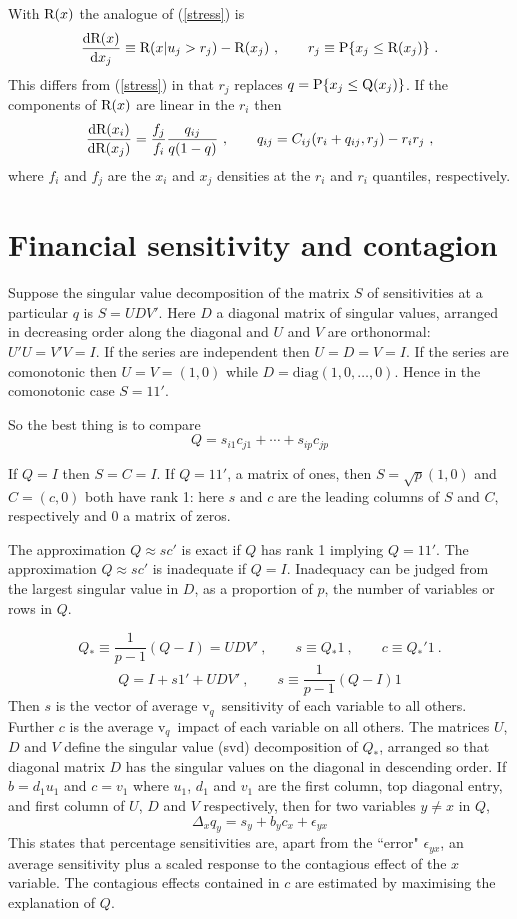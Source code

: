 \documentclass[authoryear]{elsarticle}
\newcommand{\p}{\mathrm{P}}
\newcommand{\diag}{\mathrm{diag}}
\newcommand{\eps}{\epsilon}
\newcommand{\be}{\begin{equation}}
\newcommand{\ee}{\end{equation}}
\newcommand{\de}{\mathrm{d}}
\renewcommand{\v}{\ensuremath{\mathrm{v}_q}}
\newcommand{\eref}[1]{(\ref{#1})}
\newcommand{\cq}{\ , \qquad}
\begin{document}
With $\mathrm{R}(x)$ the analogue of \eref{stress} is 
\be\label{stress2}
\frac{\de\r(x)}{\de x_j} \equiv \r(x|u_j>r_j) - \r(x_j)\cq r_j\equiv\p\{x_j\le\r(x_j)\} \ .
\ee
This differs from \eref{stress}  in that  $r_j$ replaces $q=\p\{x_j\le\q(x_j)\}$.   If  the components of $\mathrm{R}(x)$ are linear in the $r_i$ then
\be\label{implicit2}
\frac{\de\r(x_i)}{\de\r(x_j)} =  
\frac{f_j}{f_i} 
 \frac{q_{ij}}{q(1-q)}\cq q_{ij}=C_{ij}(r_i+q_{ij},r_j) - r_ir_j\ ,
\ee
where $f_i$ and $f_j$ are the $x_i$ and $x_j$ densities at the $r_i$ and $r_i$ quantiles, respectively. 


\section{Financial sensitivity and contagion}
 

Suppose the singular value decomposition of the  matrix $S$ of sensitivities at a particular $q$ is 
$S= UDV'$.  Here  $D$ a diagonal matrix of singular values, arranged in decreasing order along the diagonal and $U$ and $V$ are orthonormal:  $U'U=V'V=I$.  If the series are independent then $U=D=V=I$.   If the series are comonotonic then $U=V=(1,0)$ while $D=\diag(1,0,\ldots,0)$.  Hence in the comonotonic case $S=11'$.

So the best thing is to compare 
$$
Q= s_{i1}c_{j1} + \cdots + s_{ip}c_{jp} 
$$

If $Q=I$ then $S=C=I$.   If $Q=11'$, a matrix of ones, then $S=\sqrt{p}(1,0)$ and $C=(c,0)$ both have rank 1:  here $s$ and $c$ are the leading columns of $S$ and $C$, respectively and 0 a matrix of zeros.

The approximation $Q\approx sc'$ is exact if $Q$ has rank 1 implying $Q=11'$.   The approximation $Q\approx sc'$ is inadequate if $Q=I$.  Inadequacy can be judged from the largest singular value in $D$, as a proportion of $p$, the number of variables or rows in $Q$.

$$
Q_* \equiv \frac{1}{p-1}(Q-I)=UDV'\cq s\equiv Q_*1\cq c\equiv Q_*'1\ .
$$$$
Q=I + s1'+ UDV'\cq s\equiv \frac{1}{p-1}(Q-I)1
$$
Then $s$ is the vector of average \v\ sensitivity of each variable to all others.  Further $c$ is the average \v\ impact of each variable on all others.   The matrices $U$, $D$ and $V$ define the singular value (svd) decomposition of $Q_*$, arranged so that diagonal matrix $D$ has the singular values on  the diagonal in descending order.   If $b=d_1u_1$ and $c=v_1$ where $u_1$, $d_1$ and $v_1$ are the first column, top diagonal entry, and first column of $U$, $D$ and $V$ respectively, then  for two variables $y\ne x$ in $Q$,
$$
\Delta_x q_y = s_y+ b_yc_x +\eps_{yx}
$$
This states that percentage sensitivities are, apart from the ``error" $\eps_{yx}$, an average sensitivity plus a scaled response to the contagious effect of the $x$ variable.   The contagious effects contained in $c$ are estimated by maximising the explanation of $Q$.
\end{document}
